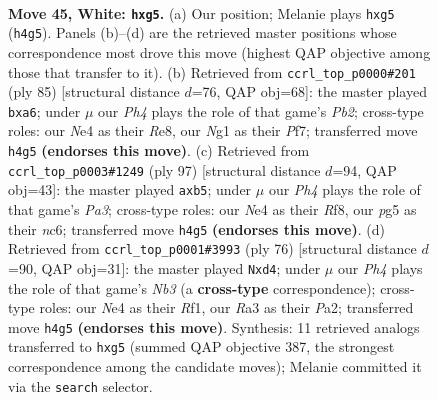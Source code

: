 \documentclass[11pt]{article}
\begin{document}
\clearpage

\begin{figure}[p]\centering
\begin{subfigure}{0.46\textwidth}\centering
\resizebox{\linewidth}{!}{%
\newchessgame
\chessboard[
  setfen={6r1/3kn1br/4n3/6pp/P3N2P/R5R1/5KP1/6N1 w - - 0 45},
  showmover=false,
  pgfstyle=straightmove, color=movearrow, markmove={h4-g5}
]}
\caption{}
\end{subfigure}\hfill
\begin{subfigure}{0.46\textwidth}\centering
\resizebox{\linewidth}{!}{%
\newchessgame
\chessboard[
  setfen={4r1k1/1p3pp1/P6r/1P1pbn2/8/2P5/R3N3/R4KB1 b - - 0 43},
  showmover=false,
  pgfstyle=straightmove, color=movearrow, markmove={b7-a6}
]}
\caption{}
\end{subfigure}
\\[4pt]
\begin{subfigure}{0.46\textwidth}\centering
\resizebox{\linewidth}{!}{%
\newchessgame
\chessboard[
  setfen={2r2r2/3R1pk1/p1N5/PP1p1Pp1/3Pn3/8/8/2R3K1 b - - 0 49},
  showmover=false,
  pgfstyle=straightmove, color=movearrow, markmove={a6-b5}
]}
\caption{}
\end{subfigure}\hfill
\begin{subfigure}{0.46\textwidth}\centering
\resizebox{\linewidth}{!}{%
\newchessgame
\chessboard[
  setfen={4r1n1/p4k1p/2r2bp1/1p6/3p1R2/1N6/PPPN2P1/1K3R2 w - - 0 39},
  showmover=false,
  pgfstyle=straightmove, color=movearrow, markmove={b3-d4}
]}
\caption{}
\end{subfigure}
\caption{\textbf{Move 45, White: \texttt{hxg5}.} (a) Our position; Melanie plays \texttt{hxg5} (\texttt{h4g5}). Panels (b)--(d) are the retrieved master positions whose correspondence most drove this move (highest QAP objective among those that transfer to it). (b) Retrieved from \texttt{ccrl\_top\_p0000\#201} (ply 85) [structural distance $d$=76, QAP obj=68]: the master played \texttt{bxa6}; under $\mu$ our \emph{Ph4} plays the role of that game's \emph{Pb2}; cross-type roles: our \emph{N}e4 as their \emph{R}e8, our \emph{N}g1 as their \emph{P}f7; transferred move \texttt{h4g5} \textbf{(endorses this move)}. (c) Retrieved from \texttt{ccrl\_top\_p0003\#1249} (ply 97) [structural distance $d$=94, QAP obj=43]: the master played \texttt{axb5}; under $\mu$ our \emph{Ph4} plays the role of that game's \emph{Pa3}; cross-type roles: our \emph{N}e4 as their \emph{R}f8, our \emph{p}g5 as their \emph{n}c6; transferred move \texttt{h4g5} \textbf{(endorses this move)}. (d) Retrieved from \texttt{ccrl\_top\_p0001\#3993} (ply 76) [structural distance $d$=90, QAP obj=31]: the master played \texttt{Nxd4}; under $\mu$ our \emph{Ph4} plays the role of that game's \emph{Nb3} (a \textbf{cross-type} correspondence); cross-type roles: our \emph{N}e4 as their \emph{R}f1, our \emph{R}a3 as their \emph{P}a2; transferred move \texttt{h4g5} \textbf{(endorses this move)}. Synthesis: 11 retrieved analogs transferred to \texttt{hxg5} (summed QAP objective 387, the strongest correspondence among the candidate moves); Melanie committed it via the \texttt{search} selector.}
\label{fig:thought-m88}
\end{figure}
\end{document}
